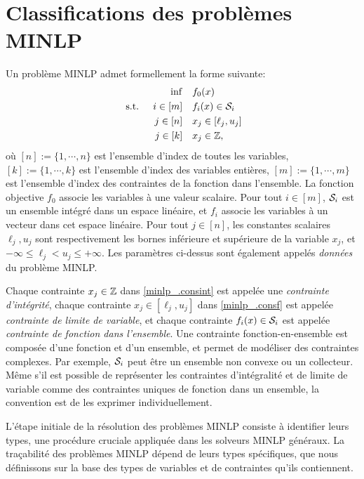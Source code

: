 \section{Classifications des problèmes MINLP} %
Un problème MINLP admet formellement la forme suivante:
\begin{subequations}
    \label{minlp_}
    \begin{align}
       \inf &  \quad f_0(x) \label{minlp_.obj} \\
    \textup{ s.t. } \quad i \in [m] & \quad f_i(x) \in \mathcal S_i  \label{minlp_.consf} \\
      j \in [n] &  \quad x_j \in [\ell_j, u_j] \label{minlp_.consfbd}\\
      j \in [k] & \quad x_j \in \mathbb Z, \label{minlp_.consint}
    \end{align}
    \end{subequations}
où $[n]:=\{1,\cdots,n\}$ est l'ensemble d'index de toutes les variables, $[k]:=\{1,\cdots,k\}$ est l'ensemble d'index des variables entières, $[m]:=\{1,\cdots,m\}$ est l'ensemble d'index des contraintes de la fonction dans l'ensemble.  La fonction objective $f_0$ associe les variables à une valeur scalaire. Pour tout $i \in [m]$, $\mathcal S_i$ est un ensemble intégré dans un espace linéaire, et $f_i$ associe les variables à un vecteur dans cet espace linéaire. Pour tout $j \in [n]$, les constantes scalaires $\ell_j , u_j$ sont respectivement les bornes inférieure et supérieure de la variable $x_j$, et $-\infty \le \ell_j < u_j \le +\infty$. Les paramètres ci-dessus sont également appelés \emph{données} du problème MINLP.

Chaque contrainte $x_j \in \mathbb Z$ dans \eqref{minlp_.consint} est appelée une \emph{contrainte d'intégrité}, chaque contrainte $x_j \in [\ell_j, u_j]$ dans \eqref{minlp_.consf} est appelée \emph{contrainte de limite de variable}, et chaque contrainte $f_i(x) \in \mathcal S_i$ est appelée \emph{contrainte de fonction dans l'ensemble}. Une contrainte fonction-en-ensemble est composée d'une fonction et d'un ensemble, et permet de modéliser des contraintes complexes. Par exemple, $\mathcal S_i$ peut être un ensemble non convexe ou un collecteur. Même s'il est possible de représenter les contraintes d'intégralité et de limite de variable comme des contraintes uniques de fonction dans un ensemble, la convention est de les exprimer individuellement.

L'étape initiale de la résolution des problèmes MINLP consiste à identifier leurs types, une procédure cruciale appliquée dans les solveurs MINLP généraux. La traçabilité des problèmes MINLP dépend de leurs types spécifiques, que nous définissons sur la base des types de variables et de contraintes qu'ils contiennent.



